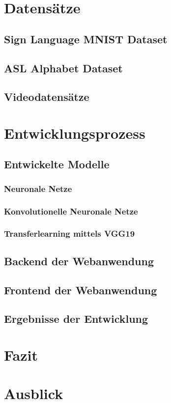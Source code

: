 \documentclass[11pt,bibliography=totocnumbered]{scrartcl}
\begin{document}
\section{Datensätze}
\subsection{Sign Language MNIST Dataset}
\subsection{ASL Alphabet Dataset}
\subsection{Videodatensätze}
\section{Entwicklungsprozess}
\subsection{Entwickelte Modelle}
\subsubsection{Neuronale Netze}
\subsubsection{Konvolutionelle Neuronale Netze}
\subsubsection{Transferlearning mittels VGG19}
\subsection{Backend der Webanwendung}
\subsection{Frontend der Webanwendung}
\subsection{Ergebnisse der Entwicklung}
\section{Fazit} 
\section{Ausblick}
\setcounter{biburllcpenalty}{7000}
\setcounter{biburlucpenalty}{8000}
\pagebreak
\printbibliography[title=Quellen]
\end{document}
